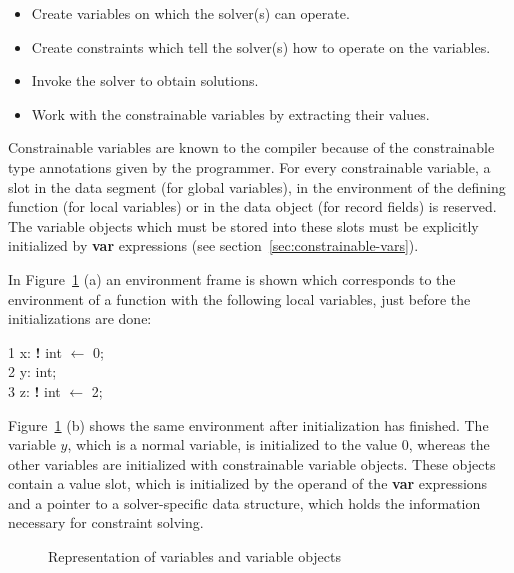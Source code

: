 \begin{itemize}
\item Create variables on which the solver(s) can operate.
\item Create constraints which tell the solver(s) how to operate on
  the variables.
\item Invoke the solver to obtain solutions.
\item Work with the constrainable variables by extracting their values.
\end{itemize}

Constrainable variables are known to the compiler because of the
constrainable type annotations given by the programmer.  For every
constrainable variable, a slot in the data segment (for global
variables), in the environment of the defining function (for local
variables) or in the data object (for record fields) is reserved.  The
variable objects which must be stored into these slots must be explicitly
initialized by {\bf var} expressions (see
section~\ref{sec:constrainable-vars}).

In Figure~\ref{pic:variable-rep} (a) an environment frame is shown
which corresponds to the environment of a function with the following
local variables, just before the initializations are done:

\begin{ttlprog}
1\>\ttlVar{} x: {\bf!} int $\leftarrow$ \ttlVar{} 0;\\
2\>\ttlVar{} y: int;\\
3\>\ttlVar{} z: {\bf!} int $\leftarrow$ \ttlVar{} 2;
\end{ttlprog}

Figure~\ref{pic:variable-rep} (b) shows the same environment after
initialization has finished.  The variable $y$, which is a normal
variable, is initialized to the value 0, whereas the other variables
are initialized with constrainable variable objects.  These objects
contain a value slot, which is initialized by the operand of the {\bf
  var} expressions and a pointer to a solver-specific data structure,
which holds the information necessary for constraint solving.

\begin{figure}[htp]
\begin{center}

\end{center}
\caption{Representation of variables and variable objects}%
\label{pic:variable-rep}
\end{figure}


